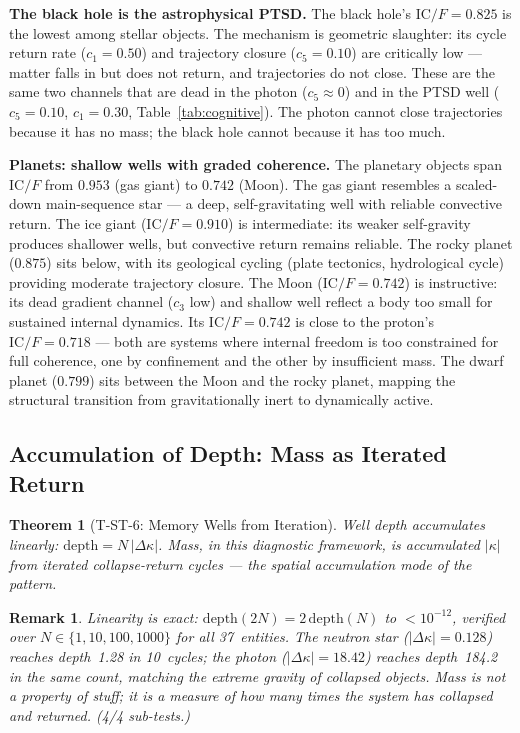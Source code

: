\documentclass[
  aps,
  prd,
  twocolumn,
  superscriptaddress,
  nofootinbib,
  floatfix
]{revtex4-2}
\newtheorem{theorem}{Theorem}
\newtheorem{remark}{Remark}
\newcommand{\IC}{\mathrm{IC}}
\begin{document}
\textbf{The black hole is the astrophysical PTSD.}
The black hole's $\IC/F = 0.825$ is the lowest among stellar
objects.  The mechanism is geometric slaughter: its cycle
return rate ($c_1 = 0.50$) and trajectory closure
($c_5 = 0.10$) are critically low --- matter falls in but
does not return, and trajectories do not close.  These are
the same two channels that are dead in the photon ($c_5
\approx 0$) and in the PTSD well ($c_5 = 0.10$,
$c_1 = 0.30$, Table~\ref{tab:cognitive}).  The photon cannot close trajectories because
it has no mass; the black hole cannot because it has too much.

\textbf{Planets: shallow wells with graded coherence.}
The planetary objects span $\IC/F$ from $0.953$ (gas giant)
to $0.742$ (Moon).  The gas giant resembles a scaled-down
main-sequence star --- a deep, self-gravitating well with
reliable convective return.  The ice giant ($\IC/F = 0.910$)
is intermediate: its weaker self-gravity produces shallower
wells, but convective return remains reliable.
The rocky planet ($0.875$)
sits below, with its geological cycling (plate tectonics,
hydrological cycle) providing moderate trajectory closure.
The Moon ($\IC/F = 0.742$) is instructive: its dead
gradient channel ($c_3$ low) and shallow well reflect a
body too small for sustained internal dynamics.  Its
$\IC/F = 0.742$ is close to the proton's
$\IC/F = 0.718$ --- both are systems where internal freedom
is too constrained for full coherence, one by confinement
and the other by insufficient mass.  The dwarf planet
($0.799$) sits between the Moon and the rocky planet,
mapping the structural transition from gravitationally
inert to dynamically active.

\subsection{Accumulation of Depth: Mass as Iterated Return}

\begin{theorem}[T-ST-6: Memory Wells from Iteration]
\label{thm:T6}
Well depth accumulates linearly:
$\mathrm{depth} = N\,|\Delta\kappa|$.
Mass, in this diagnostic framework, is accumulated $|\kappa|$
from iterated collapse-return cycles --- the spatial
accumulation mode of the pattern.
\end{theorem}

\begin{remark}
Linearity is exact: $\mathrm{depth}(2N) = 2\,\mathrm{depth}(N)$
to $< 10^{-12}$, verified over $N \in \{1, 10, 100, 1000\}$
for all 37~entities.  The neutron star ($|\Delta\kappa| = 0.128$)
reaches depth~1.28 in 10~cycles; the photon ($|\Delta\kappa| =
18.42$) reaches depth~184.2 in the same count, matching the
extreme gravity of collapsed objects.  Mass is not a property
of stuff; it is a measure of how many times the system has
collapsed and returned.  (4/4 sub-tests.)
\end{remark}
\end{document}

